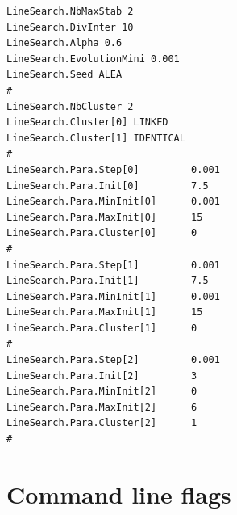 \documentclass[a4paper,titlepage]{report}
\begin{document}
{\begin{verbatim}
LineSearch.NbMaxStab 2
LineSearch.DivInter 10
LineSearch.Alpha 0.6
LineSearch.EvolutionMini 0.001
LineSearch.Seed ALEA
#
LineSearch.NbCluster 2
LineSearch.Cluster[0] LINKED
LineSearch.Cluster[1] IDENTICAL
#
LineSearch.Para.Step[0]         0.001
LineSearch.Para.Init[0]         7.5
LineSearch.Para.MinInit[0]      0.001
LineSearch.Para.MaxInit[0]      15
LineSearch.Para.Cluster[0]      0
#
LineSearch.Para.Step[1]         0.001
LineSearch.Para.Init[1]         7.5
LineSearch.Para.MinInit[1]      0.001
LineSearch.Para.MaxInit[1]      15
LineSearch.Para.Cluster[1]      0
#
LineSearch.Para.Step[2]         0.001
LineSearch.Para.Init[2]         3
LineSearch.Para.MinInit[2]      0
LineSearch.Para.MaxInit[2]      6
LineSearch.Para.Cluster[2]      1
#
\end{verbatim} }

\section{Command line flags}
 
\end{document}
